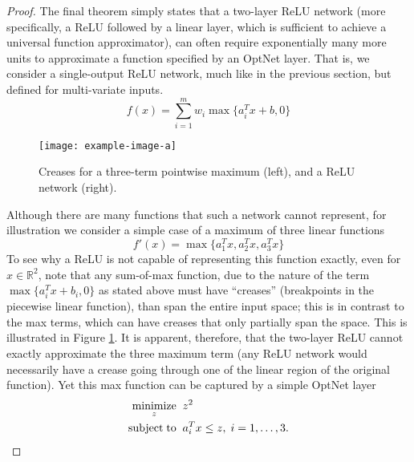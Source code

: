 \begin{proof}
    The final theorem simply states that a two-layer ReLU network (more
    specifically, a ReLU followed by a linear layer, which is sufficient to achieve
    a universal function approximator), can often require exponentially many more
    units to approximate a function specified by an OptNet layer. That is, we
    consider a single-output ReLU network, much like in the previous section, but
    defined for multi-variate inputs.
    \begin{equation}
        f(x) = \sum_{i=1}^m w_i \max \{ a_i^T x + b, 0\}
    \end{equation}

    \begin{figure}[t]
        \centering
        \texttt{[image: example-image-a]}
        \caption{Creases for a three-term pointwise maximum (left), and a ReLU network
            (right).}
        \label{fig:creases}
    \end{figure}

    Although there are many functions that such a network cannot represent, for
    illustration we consider a simple case of a maximum of three linear functions
    \begin{equation}
        f'(x) = \max\{a_1^Tx, a_2^T x, a_3^T x\}
    \end{equation}
    To see why a ReLU is not capable of representing this function exactly, even for
    $x \in \mathbb{R}^2$, note that any sum-of-max function, due to the nature of
    the term $\max\{a_i^Tx + b_i, 0\}$ as stated above must have ``creases''
    (breakpoints in the piecewise linear function), than span the entire input
    space; this is in contrast to the max terms, which can have creases that only
    partially span the space.  This is illustrated in Figure \ref{fig:creases}.  It
    is apparent, therefore, that the two-layer ReLU cannot exactly approximate the
    three maximum term (any ReLU network would necessarily have a crease going
    through one of the linear region of the original function).  Yet this max
    function can be captured by a simple OptNet layer
    \begin{equation}
        \begin{split}
            \operatorname*{minimize}_z \;\; & z^2  \\
            \operatorname*{subject\;to} \;\; & a_i^T x \leq z, \; i=1,\ldots, 3.
        \end{split}
    \end{equation}


\end{proof}
